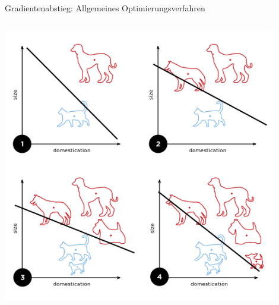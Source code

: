 \documentclass[aspectratio=1610, xcolor=dvipsnames, 9pt]{beamer}
\begin{document}
\begin{frame}{Gradientenabstieg: Allgemeines Optimierungsverfahren}
\begin{columns}
\begin{column}{0.3\textwidth}
            \includegraphics[width=0.9\textwidth]{images/Perceptron_example.svg.png}
          \end{column}
        \end{columns}
      \end{frame}
\end{document}
